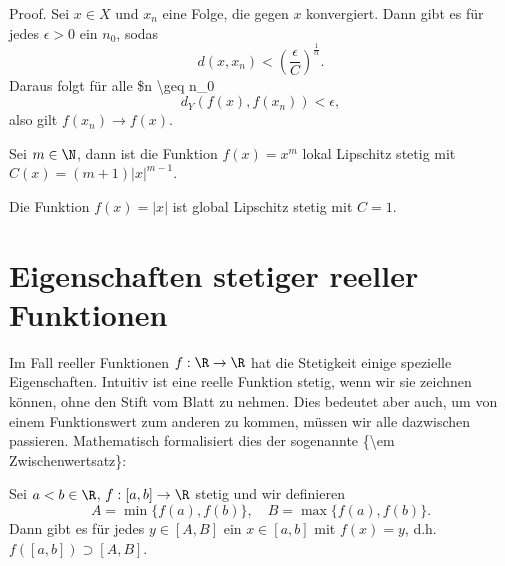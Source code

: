 \documentclass[letterpaper,10pt,english]{jupyterBook}
\begin{document}
\begin{emphBox}{}{}
Proof.  Sei \(x \in X\) und \(x_n\) eine Folge, die gegen \(x\) konvergiert. Dann gibt es für jedes \(\epsilon > 0\) ein \(n_0\), sodas
\begin{equation*}
 d(x,x_n) < \left( \frac{\epsilon}{C} \right)^{\frac{1}\alpha} .
\end{equation*}
Daraus folgt für alle \$n \textbackslash{}geq n\_0
\begin{equation*}
 d_Y(f(x),f(x_n)) < \epsilon ,
\end{equation*}
also gilt \(f(x_n) \rightarrow f(x). \)
\end{emphBox}
\label{stetigkeit/stetigkeit:example-9}
\begin{example}{}{}



Sei \(m \in \N\), dann ist die Funktion \(f(x)=x^m\) lokal Lipschitz stetig mit \(C(x) = ( m+1) |x|^{m-1}\).
\end{example}
\label{stetigkeit/stetigkeit:example-10}
\begin{example}{}{}



Die Funktion \(f(x)=|x|\) ist global Lipschitz stetig mit \(C=1\).
\end{example}


\section{Eigenschaften stetiger reeller Funktionen}
\label{\detokenize{stetigkeit/eigenschaften:eigenschaften-stetiger-reeller-funktionen}}\label{\detokenize{stetigkeit/eigenschaften::doc}}
Im Fall reeller Funktionen \(f: \R \rightarrow \R\) hat die Stetigkeit einige spezielle Eigenschaften. Intuitiv ist eine reelle Funktion stetig, wenn wir sie zeichnen können, ohne den Stift vom Blatt zu nehmen. Dies bedeutet aber auch, um von einem Funktionswert zum anderen zu kommen, müssen wir alle dazwischen passieren. Mathematisch formalisiert dies der sogenannte \{\textbackslash{}em Zwischenwertsatz\}:
\label{stetigkeit/eigenschaften:theorem-0}
\begin{theorem}{}{}



Sei  \(a<b \in \R\), \(f: [a,b] \rightarrow \R\) stetig und wir definieren
\begin{equation*}
 A = \min\{f(a),f(b)\}, \quad B = \max\{f(a),f(b)\}.
\end{equation*}
Dann gibt es für jedes \(y \in [A,B]\) ein \(x \in [a,b]\) mit \(f(x) =y\), d.h. \(f([a,b]) \supset [A,B]\).
\end{theorem}
\end{document}

